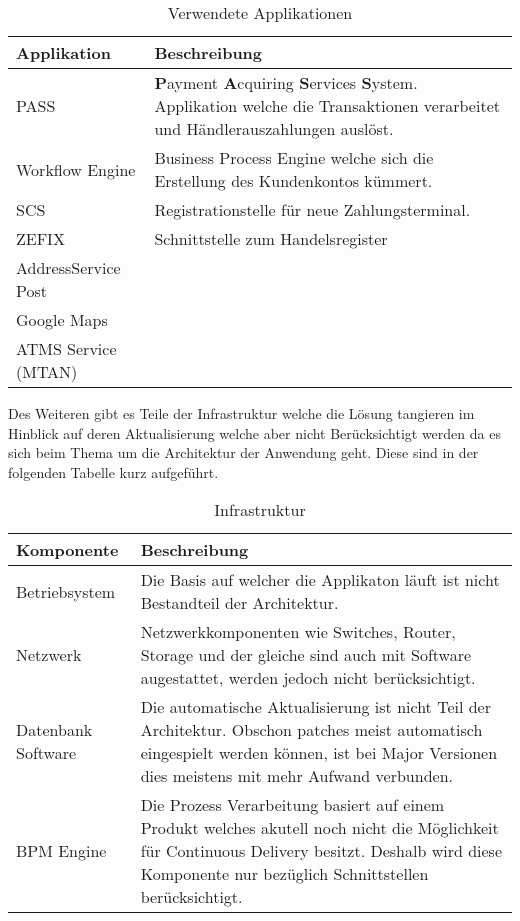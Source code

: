 \begin{table}[H]
	\centering
	\caption{Verwendete Applikationen}
	\begin{tabular}{ | p{2cm} | p{14cm} | }
		\toprule
		{\textbf{Applikation}} & {\textbf{Beschreibung}} \\
		\midrule
		PASS & \textbf{P}ayment \textbf{A}cquiring \textbf{S}ervices \textbf{S}ystem. Applikation welche die Transaktionen verarbeitet und Händlerauszahlungen auslöst. \\ \hline
		Workflow Engine & Business Process Engine welche sich die Erstellung des Kundenkontos kümmert.\\ \hline
		SCS & Registrationstelle für neue Zahlungsterminal.\\ \hline
		ZEFIX & Schnittstelle zum Handelsregister\\ \hline
		AddressService Post\\ \hline
		Google Maps\\ \hline
		ATMS Service (MTAN)\\
		\bottomrule
	\end{tabular}
\end{table}

Des Weiteren gibt es Teile der Infrastruktur welche die Lösung tangieren im Hinblick auf deren Aktualisierung welche aber nicht Berücksichtigt werden da es sich beim Thema um die Architektur der Anwendung geht. Diese sind in der folgenden Tabelle kurz aufgeführt.

\begin{table}[H]
	\centering
	\caption{Infrastruktur}
	\begin{tabular}{ | p{2cm} | p{14cm} | }
		\toprule
		{\textbf{Komponente}} & {\textbf{Beschreibung}} \\
		\midrule
		Betriebsystem & Die Basis auf welcher die Applikaton läuft ist nicht Bestandteil der Architektur. \\ \hline
		Netzwerk & Netzwerkkomponenten wie Switches, Router, Storage und der gleiche sind auch mit Software augestattet, werden jedoch nicht berücksichtigt.\\ \hline
		Datenbank Software & Die automatische Aktualisierung ist nicht Teil der Architektur. Obschon patches meist automatisch eingespielt werden können, ist bei Major Versionen dies meistens mit mehr Aufwand verbunden. \\ \hline
		BPM Engine & Die Prozess Verarbeitung basiert auf einem Produkt welches akutell noch nicht die Möglichkeit für Continuous Delivery besitzt. Deshalb wird diese Komponente nur bezüglich Schnittstellen berücksichtigt.\\
		\bottomrule
	\end{tabular}
\end{table}


